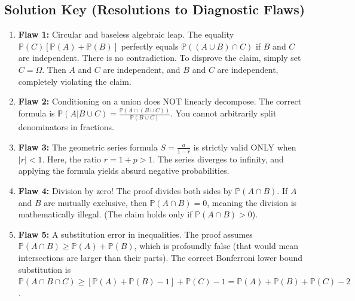 \documentclass[12pt]{article}
\theoremstyle{definition}
\theoremstyle{remark}
\begin{document}
\subsection{Solution Key (Resolutions to Diagnostic Flaws)}
\begin{enumerate}
    \item \textbf{Flaw 1:} Circular and baseless algebraic leap. The equality $\mathbb{P}(C)[\mathbb{P}(A) + \mathbb{P}(B)]$ perfectly equals $\mathbb{P}((A \cup B) \cap C)$ if $B$ and $C$ are independent. There is no contradiction. To disprove the claim, simply set $C = \Omega$. Then $A$ and $C$ are independent, and $B$ and $C$ are independent, completely violating the claim.
    \item \textbf{Flaw 2:} Conditioning on a union does NOT linearly decompose. The correct formula is $\mathbb{P}(A | B \cup C) = \frac{\mathbb{P}(A \cap (B \cup C))}{\mathbb{P}(B \cup C)}$. You cannot arbitrarily split denominators in fractions.
    \item \textbf{Flaw 3:} The geometric series formula $S = \frac{a}{1-r}$ is strictly valid ONLY when $|r| < 1$. Here, the ratio $r = 1+p > 1$. The series diverges to infinity, and applying the formula yields absurd negative probabilities.
    \item \textbf{Flaw 4:} Division by zero! The proof divides both sides by $\mathbb{P}(A \cap B)$. If $A$ and $B$ are mutually exclusive, then $\mathbb{P}(A \cap B) = 0$, meaning the division is mathematically illegal. (The claim holds only if $\mathbb{P}(A \cap B) > 0$).
    \item \textbf{Flaw 5:} A substitution error in inequalities. The proof assumes $\mathbb{P}(A \cap B) \ge \mathbb{P}(A) + \mathbb{P}(B)$, which is profoundly false (that would mean intersections are larger than their parts). The correct Bonferroni lower bound substitution is $\mathbb{P}(A \cap B \cap C) \ge [\mathbb{P}(A) + \mathbb{P}(B) - 1] + \mathbb{P}(C) - 1 = \mathbb{P}(A) + \mathbb{P}(B) + \mathbb{P}(C) - 2$.
\end{enumerate}
\end{document}
